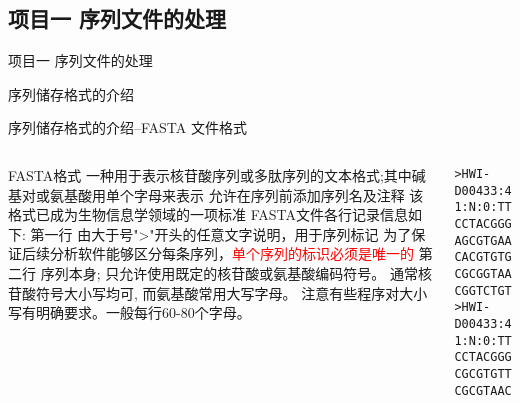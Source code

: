 \subsection{项目一 序列文件的处理}

\begin{frame}[standout] 项目一 \quad 序列文件的处理 \end{frame}

\begin{frame}[standout] 序列储存格式的介绍 \end{frame}
\begin{frame}[fragile]{序列储存格式的介绍--FASTA 文件格式}
    \begin{columns}
        \begin{myoutline}
            \1 FASTA格式
                \2 一种用于表示核苷酸序列或多肽序列的文本格式;其中碱基对或氨基酸用单个字母来表示
                \2 允许在序列前添加序列名及注释
                \2 该格式已成为生物信息学领域的一项标准
            \1 FASTA文件各行记录信息如下:
                \2 第一行
                    \3 由大于号">"开头的任意文字说明，用于序列标记
                    \3 为了保证后续分析软件能够区分每条序列，\textcolor{red}{单个序列的标识必须是唯一的}
                \2 第二行
                    \3 序列本身; 只允许使用既定的核苷酸或氨基酸编码符号。
                    \3 通常核苷酸符号大小写均可, 而氨基酸常用大写字母。
                    \3 注意有些程序对大小写有明确要求。一般每行60-80个字母。
        \end{myoutline}
        \begin{lstlisting}
>HWI-D00433:463:HNT7JBCXX:1:1101:19071:2193 1:N:0:TTCTCCAT
CCTACGGGACGCATCAGTGAGGAATATTGGTCAATGGACGCGAGTCTGAACCAGCCAAGT
AGCGTGAAGGATGAAGGCCCGATGGGTTGTAAACCTCTTTTATCTGGGAATAAAACGTGC
CACGTGTGGTATTTTGTATGTACCATAAGAATAAGTATCGGCTAACTCCGTGCCAGCAGC
CGCGGTAATACGGAGGATCCGAGCGTTATCCGGATTTATTGGGTTTAAAGGGTGCGCAGG
CGGTCTGTTA
>HWI-D00433:463:HNT7JBCXX:1:1101:1713:2316 1:N:0:TTCTCCAT
CCTACGGGGTTCACCAGTAGGGAATCTTCCACAATGGGCGAAAGCCTGATTGAGCAAAGC
CGCGTGTTTTAAGAAGGTCTTCGGATCGTAAAACCCTGTTGTTAGAGAAGAAAGTGCGTG
CGCGTAACTGTTCACGTTTCTACTGTATCTAACAAGAAAGCACCGGCTAACTACGTTCCA
        \end{lstlisting}
    \end{columns}
\end{frame}

